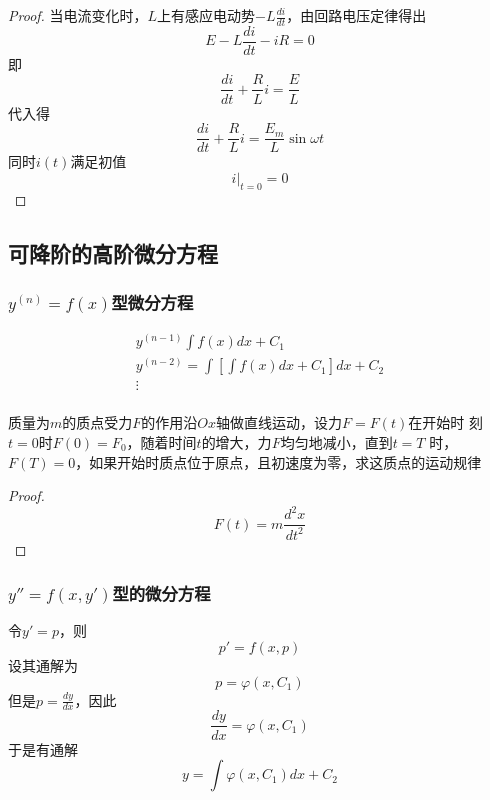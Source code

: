\documentclass[11pt]{article}
\begin{document}
\begin{proof}
当电流变化时，\(L\)上有感应电动势\(-L\frac{di}{dt}\)，由回路电压定律得出
\begin{equation*}
E-L\frac{di}{dt}-iR=0
\end{equation*}
即
\begin{equation*}
\frac{di}{dt}+\frac{R}{L}i=\frac{E}{L}
\end{equation*}
代入得
\begin{equation*}
 \frac{di}{dt}+\frac{R}{L}i=\frac{E_m}{L}\sin\omega t
\end{equation*}
同时\(i(t)\)满足初值
\begin{equation*}
i|_{t=0}=0
\end{equation*}
\end{proof}
\subsection{可降阶的高阶微分方程}
\label{sec:org9e2b687}
\subsubsection{\(y^{(n)}=f(x)\)型微分方程}
\label{sec:org979207a}
\begin{gather*}
y^{(n-1)}\int f(x)dx+C_1\\
y^{(n-2)}=\int[\int f(x)dx+C_1]dx+C_2\\
\vdots\\
\end{gather*}

\begin{proposition}[]
质量为\(m\)的质点受力\(F\)的作用沿\(Ox\)轴做直线运动，设力\(F=F(t)\)在开始时
刻\(t=0\)时\(F(0)=F_0\)，随着时间\(t\)的增大，力\(F\)均匀地减小，直到\(t=T\)
时，\(F(T)=0\)，如果开始时质点位于原点，且初速度为零，求这质点的运动规律
\end{proposition}

\begin{proof}
\begin{equation*}
F(t)=m\frac{d^2x}{dt^2}
\end{equation*}
\end{proof}
\subsubsection{\(y''=f(x,y')\)型的微分方程}
\label{sec:org6574893}
令\(y'=p\)，则
\begin{equation*}
p'=f(x,p)
\end{equation*}
设其通解为
\begin{equation*}
p=\varphi(x,C_1)
\end{equation*}
但是\(p=\frac{dy}{dx}\)，因此
\begin{equation*}
\frac{dy}{dx}=\varphi(x,C_1)
\end{equation*}
于是有通解
\begin{equation*}
y=\int\varphi(x,C_1)dx+C_2
\end{equation*}
\end{document}
